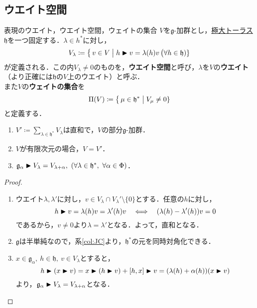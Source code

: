 \documentclass[rep_main]{subfiles}
\begin{document}
\subsection{ウエイト空間}
\begin{mydef}[label=def:weightspacerep]{表現のウエイト，ウエイト空間，ウェイトの集合}
	$V$を$\mathfrak{g}$-加群とし，\hyperref[def:toral-subLieAlg]{極大トーラス}$\mathfrak{h}$を一つ固定する．$\lambda \in h^*$に対し，
	\begin{align}
		V_\lambda \coloneqq \bigl\{\, v \in V \bigm| h \blacktriangleright v = \lambda(h) v \,\bigr (\forall h \in \mathfrak{h})\}
	\end{align}
	が定義される．この内$V_\lambda \neq 0$のものを，\textbf{ウエイト空間}と呼び，$\lambda$を$V$の\textbf{ウエイト}（より正確には$\mathfrak{h}$の$V$上のウエイト）と呼ぶ．\\
	また$V$の\textbf{ウェイトの集合}を
	\begin{equation}
		\Pi(V) \coloneqq \bigl\{\, \mu \in \mathfrak{h}^* \bigm| V_\mu \neq 0\}
	\end{equation}
	と定義する．
\end{mydef}
\begin{mylem}[label=lem:weightspacerep]{}
	\begin{enumerate}
		\item $V' \coloneqq \sum_{\lambda \in \mathfrak{h}^*} V_\lambda$は直和で，$V$の部分$\mathfrak{g}$-加群．
		\item $V$が有限次元の場合，$V = V'$．
		\item $\mathfrak{g}_\alpha \blacktriangleright V_\lambda = V_{\lambda + \alpha},\ (\forall \lambda \in \mathfrak{h}^*,\ \forall \alpha \in \Phi)$．
	\end{enumerate}
\end{mylem}
\begin{proof}
	\begin{enumerate}
		\item ウエイト$\lambda, \lambda'$に対し，$v \in V_\lambda \cap V_\lambda' \setminus \{0\}$とする．任意の$h$に対し，
		\begin{equation}
			h \blacktriangleright v = \lambda(h)v = \lambda'(h)v  \quad \Longleftrightarrow \quad  (\lambda(h) - \lambda'(h))v = 0 
		\end{equation}
		であるから，$v \neq 0$より$\lambda = \lambda'$となる．よって，直和となる．
		\item $\mathfrak{g}$は半単純なので，系\ref{col:JC}より，$\mathfrak{h}^*$の元を同時対角化できる．
		\item $x \in \mathfrak{g}_\alpha,\ h \in \mathfrak{h},\ v \in V_\lambda$とすると，
		\begin{equation}
			h \blacktriangleright (x \blacktriangleright v) = x \blacktriangleright (h \blacktriangleright v) + [h, x] \blacktriangleright v = (\lambda(h) + \alpha(h))(x \blacktriangleright v)
		\end{equation}
		より，$\mathfrak{g}_\alpha \blacktriangleright V_\lambda = V_{\lambda + \alpha}$となる．
	\end{enumerate}
\end{proof}
\end{document}
